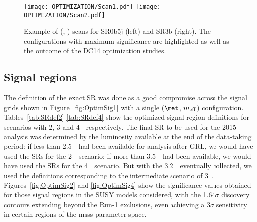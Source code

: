 \begin{figure}[!htb]
\centering
  \texttt{[image: OPTIMIZATION/Scan1.pdf]}
  \texttt{[image: OPTIMIZATION/Scan2.pdf]}
  \caption{Example of (\met, \meff) scans for SR0b5j (left) and SR3b (right). The configurations with maximum significance are highlighted as well as the outcome of the DC14 optimization studies.}
\label{fig:OptimScan}


\end{figure}




\subsection{Signal regions}
 
The definition of the exact SR was done as a good compromise across the signal grids shown in 
Figure~\ref{fig:OptimSig1} with a single ($\met$, $m_{\mathrm{eff}}$) configuration. 
Tables~\ref{tab:SRdef2}-\ref{tab:SRdef4} show the optimized signal region definitions for scenarios with 2, 3 and 4~\ifb\, respectively. 
The final SR to be used for the 2015 analysis was determined by the luminosity available at the end of the data-taking period: 
if less than 2.5~\ifb\ had been available for analysis after GRL, we would have used the SRs for the 2~\ifb\ scenario; 
if more than 3.5~\ifb\ had been available, we would have used the SRs for the 4~\ifb\ scenario. 
But with the 3.2~\ifb\ eventually collected, we used the definitions corresponding to the intermediate scenario of 3~\ifb.
Figures~\ref{fig:OptimSig2} and \ref{fig:OptimSig4} show the significance values obtained for those signal regions in the SUSY models considered, 
with the 1.64$\sigma$ discovery contours extending beyond the Run-1 exclusions, even achieving a 3$\sigma$ sensitivity in certain regions of the mass parameter space.
 
